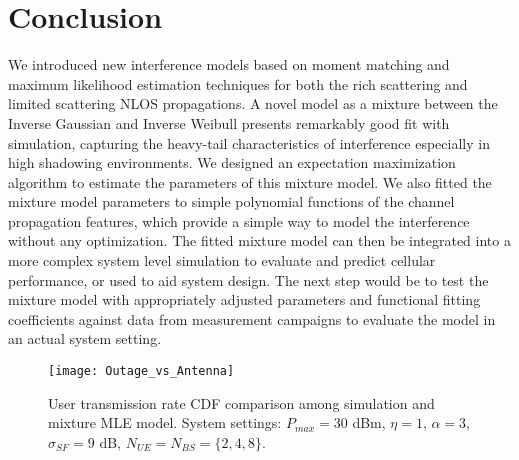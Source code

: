 \documentclass[12pt, draftclsnofoot, onecolumn]{IEEEtran}
\theoremstyle{plain}
\begin{document}
\section{Conclusion}\label{conclusion}\vspace{-.1in}
We introduced new interference models based on moment matching and maximum likelihood estimation techniques {\color{black}for both the rich scattering and limited scattering NLOS propagations}. 
A novel model as a mixture between the Inverse Gaussian and Inverse Weibull presents remarkably good fit with simulation, capturing the heavy-tail characteristics of interference especially in high shadowing environments. We designed an expectation maximization algorithm to estimate the parameters of this mixture model. 
We also fitted the mixture model parameters to simple polynomial functions of the {channel} propagation features, which provide a simple way to model the interference without any optimization. The fitted mixture model can then be integrated into a more complex system level simulation to evaluate and predict cellular performance, or used to aid system design. 
The next step would be to test the mixture model with appropriately adjusted parameters and functional fitting coefficients against data from measurement campaigns to evaluate the model in an actual system setting. 
\begin{figure}[t]%
        \centering
        \texttt{[image: Outage\_vs\_Antenna]}
        \vspace{-0.25in}
        \caption{{\small User transmission rate CDF comparison among simulation and mixture MLE model. System settings: $P_{max}=30$ dBm, $\eta=1$, $\alpha=3$, $\sigma_{SF}=9$ dB, $N_{UE}=N_{BS}=\{2, 4, 8\}$.}} 
        \label{Fig::OutageVSelements}
        \vspace{-0.48in}
    \vspace{-.15in}
\end{figure}%
\appendices
\end{document}
